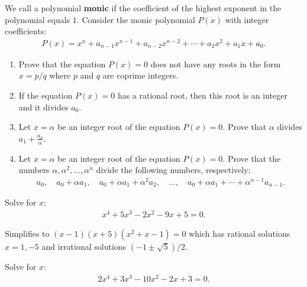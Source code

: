     \begin{question}
        We call a polynomial \textbf{monic} if the coefficient of the highest exponent in the polynomial equals $1$. Consider the monic polynomial $P(x)$ with integer coefficients:
        \begin{align*}
            P(x)=x^n + a_{n-1}x^{n-1} + a_{n-2}x^{n-2} + \cdots + a_2x^2+a_1x+a_0.
        \end{align*}
        \begin{enumerate}
            \item Prove that the equation $P(x)=0$ does not have any roots in the form $x=p/q$ where $p$ and $q$ are coprime integers.
            \item If the equation $P(x)=0$ has a rational root, then this root is an integer and it divides $a_0$.
            \item Let $x=\alpha$ be an integer root of the equation $P(x)=0$. Prove that $\alpha$ divides $a_1 + \frac{a_0}{\alpha}$.
            \item Let $x=\alpha$ be an integer root of the equation $P(x)=0$. Prove that the numbers $\alpha, \alpha^2, \dots, \alpha^n$ divide the following numbers, respectively:
            \begin{align*}
                a_0, \quad a_0+\alpha a_1, \quad a_0+\alpha a_1+\alpha^2 a_2, \quad\dots, \quad a_0+\alpha a_1+\cdots+\alpha^{n-1} a_{n-1}.
            \end{align*}
        \end{enumerate}
    \end{question}


    \begin{question}
        Solve for $x$:
        \begin{align*}
            x^4+5x^3-2x^2-9x+5=0.
        \end{align*}
    \end{question}

\begin{solution}
    Simplifies to $(x-1)(x+5)(x^2+x-1)=0$ which has rational solutions $x=1,-5$ and irrational solutions $(-1\pm\sqrt{5})/2$.
\end{solution}


    \begin{question}
        Solve for $x$:
        \begin{align*}
            2x^4+3x^3-10x^2-2x+3=0.
        \end{align*}
    \end{question}

